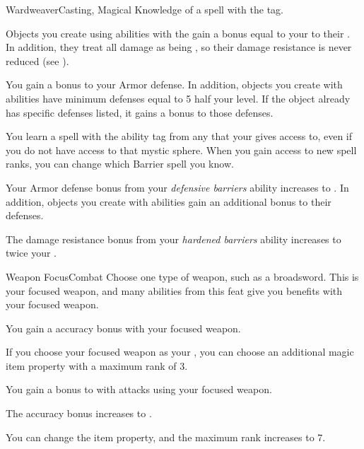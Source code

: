   \begin{magicalfeat}{Wardweaver}{Casting, Magical}
    \featpre Knowledge of a spell with the  tag.

     Objects you create using abilities with the   gain a bonus equal to your  to their .
    In addition, they treat all damage as being , so their damage resistance is never reduced (see ).

     You gain a  bonus to your Armor defense.
    In addition, objects you create with  abilities have minimum defenses equal to 5 \add half your level.
    If the object already has specific defenses listed, it gains a  bonus to those defenses.

     You learn a spell with the  ability tag from any  that your  gives access to, even if you do not have access to that mystic sphere.
    When you gain access to new spell ranks, you can change which Barrier spell you know.

     Your Armor defense bonus from your \textit{defensive barriers} ability increases to .
    In addition, objects you create with  abilities gain an additional  bonus to their defenses.

     The damage resistance bonus from your \textit{hardened barriers} ability increases to twice your .
  \end{magicalfeat}

  \begin{feat}{Weapon Focus}{Combat}
     Choose one type of weapon, such as a broadsword.
    This is your focused weapon, and many abilities from this feat give you benefits with your focused weapon.

     You gain a  accuracy bonus with your focused weapon.

     If you choose your focused weapon as your , you can choose an additional magic item property with a maximum rank of 3.

     You gain a  bonus to  with attacks using your focused weapon.

     The accuracy bonus increases to .

     You can change the item property, and the maximum rank increases to 7.
  \end{feat}

